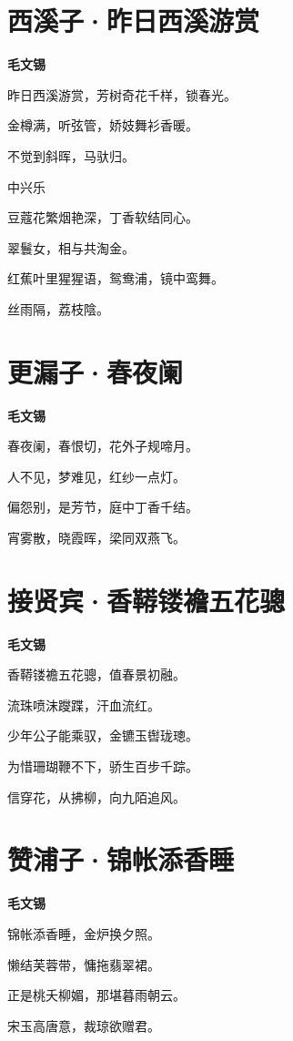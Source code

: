 \documentclass[12pt,a4paper]{ctexbook}
\begin{document}
\section{西溪子·昨日西溪游赏}
\textbf{毛文锡}\par\vspace{0.5em}
昨日西溪游赏，芳树奇花千样，锁春光。\par
金樽满，听弦管，娇妓舞衫香暖。\par
不觉到斜晖，马驮归。\par
中兴乐\par
豆蔻花繁烟艳深，丁香软结同心。\par
翠鬟女，相与共淘金。\par
红蕉叶里猩猩语，鸳鸯浦，镜中鸾舞。\par
丝雨隔，荔枝陰。\par

\section{更漏子·春夜阑}
\textbf{毛文锡}\par\vspace{0.5em}
春夜阑，春恨切，花外子规啼月。\par
人不见，梦难见，红纱一点灯。\par
偏怨别，是芳节，庭中丁香千结。\par
宵雾散，晓霞晖，梁同双燕飞。\par

\section{接贤宾·香鞯镂襜五花骢}
\textbf{毛文锡}\par\vspace{0.5em}
香鞯镂襜五花骢，值春景初融。\par
流珠喷沫躞蹀，汗血流红。\par
少年公子能乘驭，金镳玉辔珑璁。\par
为惜珊瑚鞭不下，骄生百步千踪。\par
信穿花，从拂柳，向九陌追风。\par

\section{赞浦子·锦帐添香睡}
\textbf{毛文锡}\par\vspace{0.5em}
锦帐添香睡，金炉换夕照。\par
懒结芙蓉带，慵拖翡翠裙。\par
正是桃夭柳媚，那堪暮雨朝云。\par
宋玉高唐意，裁琼欲赠君。\par
\end{document}
